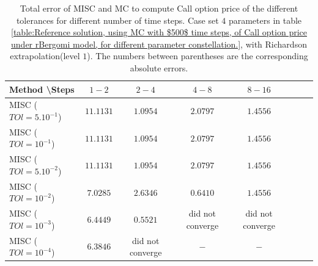 \documentclass[11pt]{article}
\begin{document}
\begin{table}[h!]
\centering
\begin{tabular}{l*{6}{c}r}
Method \textbackslash  Steps            & $1-2$ & $2-4$ & $4-8$ & $8-16$  \\
\hline
MISC ($TOl=5.10^{-1}$)  & $\mathbf{11.1131}$ & $\mathbf{1.0954}$ & $\mathbf{2.0797}$ & $\mathbf{1.4556}$ \\
MISC ($TOl=10^{-1}$)  & $\mathbf{11.1131}$ & $\mathbf{1.0954}$ & $\mathbf{2.0797}$ & $\mathbf{1.4556}$  \\
MISC ($TOl=5.10^{-2}$)  & $\mathbf{11.1131}$ & $\mathbf{1.0954}$ & $\mathbf{2.0797}$ & $\mathbf{1.4556}$  \\
MISC ($TOl=10^{-2}$)  & $\mathbf{7.0285}$ & $\mathbf{2.6346}$ & $\mathbf{0.6410}$ & $\mathbf{1.4556}$  \\	
MISC ($TOl=10^{-3}$)  & $\mathbf{6.4449}$ & $\mathbf{0.5521}$ & did not converge& did not converge  \\	
MISC ($TOl=10^{-4}$)  & $\mathbf{6.3846}$ & did not converge & $\mathbf{-}$ & $\mathbf{-}$  \\	
\hline
\end{tabular}
\caption{Total  error of MISC and MC to compute Call option price of the different tolerances for different number of time steps. Case set $4$ parameters in table \ref{table:Reference solution, using MC with $500$ time steps, of Call option price under rBergomi model, for different parameter constellation.}, with Richardson extrapolation(level $1$). The numbers between parentheses are the corresponding absolute errors.}
\label{Total  error of MISC and MC to compute Call option price of the different tolerances for different number of time steps. Case set $4$ parameters, with Richardson extrapolation(level $1$). The numbers between parentheses are the corresponding absolute errors.}
\end{table}
\end{document}
